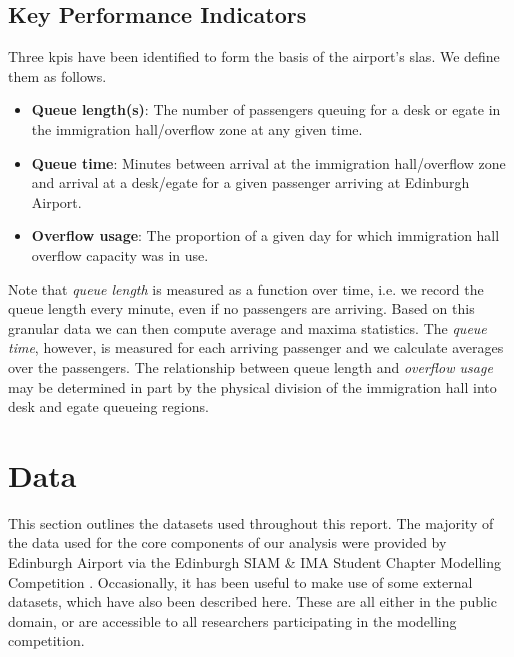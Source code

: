 \documentclass[10pt]{article}
\begin{document}
\subsection{Key Performance Indicators}

Three \glspl{kpi} have been identified to form the basis of the airport's \glspl{sla}. We define them as follows.

\begin{itemize}
    \item \textbf{Queue length(s)}: The number of passengers queuing for a desk or \gls{egate} in the immigration hall/overflow zone at any given time.
    \item \textbf{Queue time}: Minutes between arrival at the immigration hall/overflow zone and arrival at a desk/\gls{egate} for a given passenger arriving at Edinburgh Airport. 
    \item \textbf{Overflow usage}: The proportion of a given day for which immigration hall overflow capacity was in use.
\end{itemize}

Note that \textit{queue length} is measured as a function over time, i.e. we record the queue length every minute, even if no passengers are arriving. Based on this granular data we can then compute average and maxima statistics. The \textit{queue time}, however, is measured for each arriving passenger and we calculate averages over the passengers. The relationship between queue length and \textit{overflow usage} may be determined in part by the physical division of the immigration hall into desk and \gls{egate} queueing regions.


\section{Data}
This section outlines the datasets used throughout this report. The majority of the data used for the core components of our analysis were provided by Edinburgh Airport via the Edinburgh SIAM \& IMA Student Chapter Modelling Competition \cite{modelling_competition}. Occasionally, it has been useful to make use of some external datasets, which have also been described here. These are all either in the public domain, or are accessible to all researchers participating in the modelling competition. 
\end{document}
